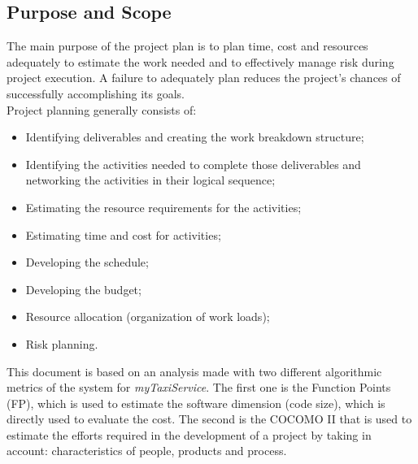 \documentclass[a4paper,11pt]{report} %
\newcommand{\mts}{\mbox{\normalfont\itshape myTaxiService}}
\begin{document}
		\subsection{Purpose and Scope}
			The main purpose of the project plan is to plan time, cost and resources adequately to estimate the work needed and to effectively manage risk during project execution. A failure to adequately plan reduces the project's chances of successfully accomplishing its goals.\smallskip\\
			Project planning generally consists of:
			\begin{itemize}
				\item Identifying deliverables and creating the work breakdown structure;
				\item Identifying the activities needed to complete those deliverables and networking the activities in their logical sequence;
				\item Estimating the resource requirements for the activities;
				\item Estimating time and cost for activities;
				\item Developing the schedule;
				\item Developing the budget;
				\item Resource allocation (organization of work loads);
				\item Risk planning.
			\end{itemize} 
			This document is based on an analysis made with two different algorithmic metrics of the system for \mts{}. The first one is the Function Points (FP), which is used to estimate the software dimension (code size), which is directly used to evaluate the cost. The second is the COCOMO II that is used to estimate the efforts required in the development of a project by taking in account: characteristics of people, products and process. 
			
\end{document}
